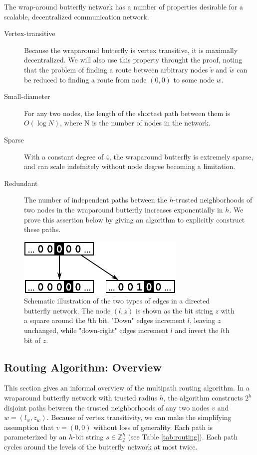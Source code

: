 \documentclass{sig-alternate-05-2015}
\begin{document}
The wrap-around butterfly network has a number of properties desirable for
a scalable, decentralized communication network.
\begin{description}
\item[Vertex-transitive]
Because the wraparound butterfly is vertex transitive,
it is maximally decentralized.
We will also use this property throught the proof, noting that
the problem of finding a route between arbitrary nodes $\tilde{v}$ and $\tilde{w}$
can be reduced to finding a route from node $(0,0)$ to some node $w$.
\item[Small-diameter]
For any two nodes, the length of the shortest path between them is
$O(\log N)$, where N is the number of nodes in the network.
\item[Sparse]
With a constant degree of 4, the wraparound butterfly is extremely sparse,
and can scale indefnitely without node degree becoming a limitation.
\item [Redundant] 
The number of independent paths between the $h$-trusted neighborhoods of two
nodes in the wraparound butterfly increases exponentially in $h$.
We prove this assertion below by giving an algorithm to explicitly construct
these paths.
\end{description}

\begin{figure}
\begin{center}
\includegraphics{fig-butterfly.pdf}
\end{center}
\caption{
Schematic illustration of the two types of edges in a directed butterfly network.
The node $(l,z)$ is shown as the bit string $z$ with a square around the $l$th bit.
"Down" edges increment $l$, leaving $z$ unchanged, while "down-right" edges
increment $l$ and invert the $l$th bit of $z$.
\label{fig:butterfly}
}
\end{figure}

\subsection{Routing Algorithm: Overview}

This section gives an informal overview of the multipath routing algorithm.
In a wraparound butterfly network with trusted radius $h$,
the algorithm constructs $2^h$ disjoint paths between the trusted neighborhoods
of any two nodes $v$ and $w = (l_w, z_w)$.
Because of vertex transitivity,
we can make the simplifying assumption that $v = (0,0)$ without loss of generality.
Each path is parameterized by an $h$-bit string $s \in \mathbb{Z}_2^h$ (see Table \ref{tab:routing}).
Each path cycles around the levels of the butterfly network at most twice.
\end{document}
